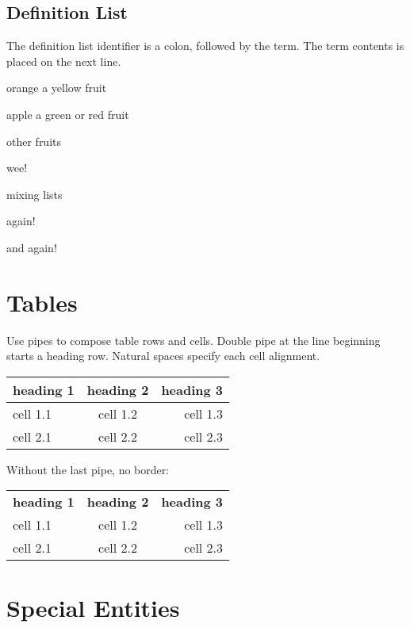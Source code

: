 \documentclass{article}
\begin{document}
\subsection*{Definition List}

The definition list identifier is a colon, followed by
the term. The term contents is placed on the next line.

\begin{compactdesc}
\item[orange]
  a yellow fruit
\item[apple]
  a green or red fruit
\item[other fruits]
  \begin{compactitem}
  \item wee!
  \item mixing lists
    \begin{compactenum}
    \item again!
    \item and again!
    \end{compactenum}
  \end{compactitem}
\end{compactdesc}

\section*{Tables}

Use pipes to compose table rows and cells.
Double pipe at the line beginning starts a heading row.
Natural spaces specify each cell alignment.

\begin{tabular}{|l|c|r|}
\hline \textbf{heading 1} & \textbf{heading 2} & \textbf{heading 3} \\
\hline cell 1.1 & cell 1.2 & cell 1.3 \\
\hline cell 2.1 & cell 2.2 & cell 2.3 \\
\hline \end{tabular}

Without the last pipe, no border:

\begin{tabular}{lcr}
\textbf{heading 1} & \textbf{heading 2} & \textbf{heading 3} \\
cell 1.1 & cell 1.2 & cell 1.3 \\
cell 2.1 & cell 2.2 & cell 2.3 \\
\end{tabular}

\section*{Special Entities}
\end{document}
